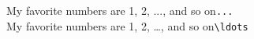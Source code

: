 \documentclass[crop]{standalone}
\begin{document}
\noindent
My favorite numbers are 1, 2, ..., and so on\hfill\verb|...|\\[12pt]
\noindent
My favorite numbers are 1, 2, \ldots, and so on\hfill\verb|\ldots|
\end{document}

